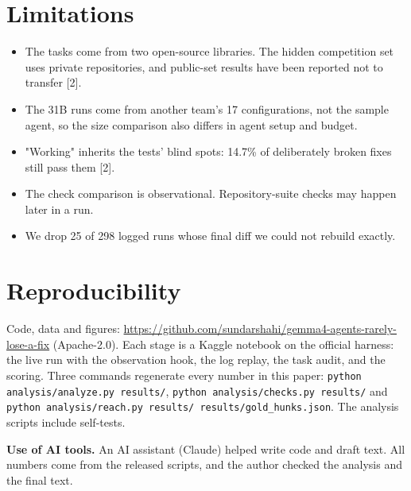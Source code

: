 \documentclass[10pt]{article}
\begin{document}
\section*{Limitations}
\begin{itemize}\setlength\itemsep{2pt}\item The tasks come from two open-source libraries. The hidden competition set uses private repositories, and public-set results have been reported not to transfer [2].\item The 31B runs come from another team's 17 configurations, not the sample agent, so the size comparison also differs in agent setup and budget.\item "Working" inherits the tests' blind spots: 14.7\% of deliberately broken fixes still pass them [2].\item The check comparison is observational. Repository-suite checks may happen later in a run.\item We drop 25 of 298 logged runs whose final diff we could not rebuild exactly.\end{itemize}
\section*{Reproducibility}
Code, data and figures: \url{https://github.com/sundarshahi/gemma4-agents-rarely-lose-a-fix} (Apache-2.0). Each stage is a Kaggle notebook on the official harness: the live run with the observation hook, the log replay, the task audit, and the scoring. Three commands regenerate every number in this paper: \texttt{python analysis/analyze.py results/}, \texttt{python analysis/checks.py results/} and \texttt{python analysis/reach.py results/ results/gold\_hunks.json}. The analysis scripts include self-tests.

\textbf{Use of AI tools.} An AI assistant (Claude) helped write code and draft text. All numbers come from the released scripts, and the author checked the analysis and the final text.
\end{document}
